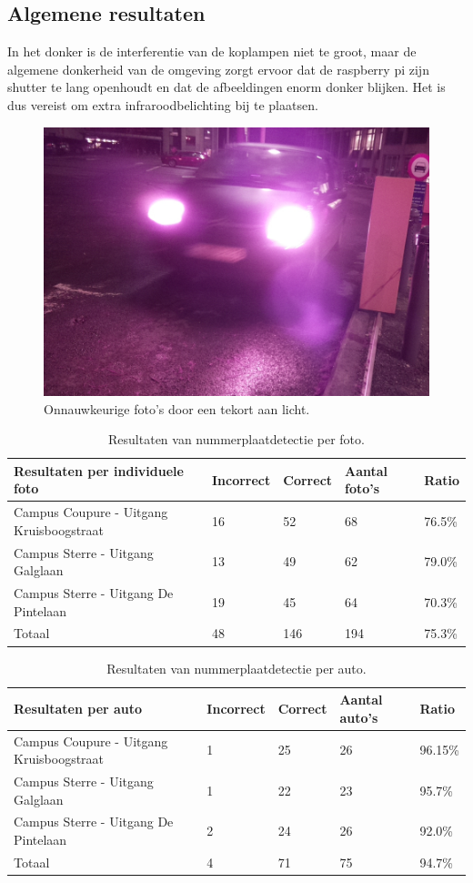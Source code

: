 \subsection{Algemene resultaten}
In het donker is de interferentie van de koplampen niet te groot, maar de algemene donkerheid van de omgeving zorgt ervoor dat de raspberry pi zijn shutter te lang openhoudt en dat de afbeeldingen enorm donker blijken. Het is dus vereist om extra infraroodbelichting bij te plaatsen.
\begin{figure}[h!]
	\centering
	\includegraphics[width=0.5\linewidth]{img/nacht-coupure.jpg}
	\caption{Onnauwkeurige foto's door een tekort aan licht.}
	\label{SterreDonker}
\end{figure}

\begin{table}[h!]
	\centering
	\begin{tabular}{l|l|l|l|l}
		\textbf{Resultaten per individuele foto}	& \textbf{Incorrect}	& \textbf{Correct} & \textbf{Aantal foto's} & \textbf{Ratio} \\ \hline
		Campus Coupure - Uitgang Kruisboogstraat & 16 & 52 & 68 & 76.5\% \\
		Campus Sterre - Uitgang Galglaan 		 & 13 & 49 & 62 & 79.0\%\\
		Campus Sterre - Uitgang De Pintelaan	 & 19 & 45 & 64 & 70.3\%\\ \hline
		Totaal 									 & 48 & 146 & 194 & 75.3\%
	\end{tabular}
	\caption{Resultaten van nummerplaatdetectie per foto.}
	\label{tab:perpic}
\end{table}

\begin{table}[h!]
	\centering
	\begin{tabular}{l|l|l|l|l}
		\textbf{Resultaten per auto} & \textbf{Incorrect}	& \textbf{Correct} & \textbf{Aantal auto's} & \textbf{Ratio} \\ \hline
		Campus Coupure - Uitgang Kruisboogstraat& 1 & 25  & 26 & 96.15\% \\
		Campus Sterre - Uitgang Galglaan		& 1 & 22  & 23 & 95.7\%\\
		Campus Sterre - Uitgang De Pintelaan	& 2 & 24  & 26 & 92.0\%\\ \hline
		Totaal 									& 4 & 71 & 75 & 94.7\%
	\end{tabular}
	\caption{Resultaten van nummerplaatdetectie per auto.}
	\label{tab:percar}
\end{table}

